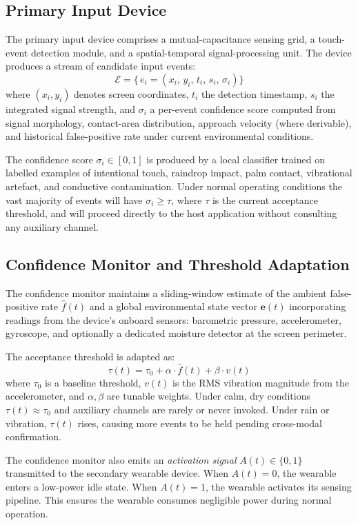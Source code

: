 \documentclass[11pt,letterpaper]{article}
\begin{document}
\subsection{Primary Input Device}

The primary input device comprises a mutual-capacitance sensing grid, a touch-event
detection module, and a spatial-temporal signal-processing unit. The device produces
a stream of candidate input events:
\[
  \mathcal{E} = \bigl\{\, e_i = (x_i,\, y_i,\, t_i,\, s_i,\, \sigma_i) \bigr\}
\]
where $(x_i, y_i)$ denotes screen coordinates, $t_i$ the detection timestamp, $s_i$
the integrated signal strength, and $\sigma_i$ a per-event confidence score computed
from signal morphology, contact-area distribution, approach velocity (where
derivable), and historical false-positive rate under current environmental conditions.

The confidence score $\sigma_i \in [0,1]$ is produced by a local classifier trained
on labelled examples of intentional touch, raindrop impact, palm contact, vibrational
artefact, and conductive contamination. Under normal operating conditions the vast
majority of events will have $\sigma_i \geq \tau$, where $\tau$ is the current
acceptance threshold, and will proceed directly to the host application without
consulting any auxiliary channel.

\subsection{Confidence Monitor and Threshold Adaptation}

The confidence monitor maintains a sliding-window estimate of the ambient
false-positive rate $\hat{f}(t)$ and a global environmental state vector
$\mathbf{e}(t)$ incorporating readings from the device's onboard sensors: barometric
pressure, accelerometer, gyroscope, and optionally a dedicated moisture detector at
the screen perimeter.

The acceptance threshold is adapted as:
\[
  \tau(t) = \tau_0 + \alpha \cdot \hat{f}(t) + \beta \cdot v(t)
\]
where $\tau_0$ is a baseline threshold, $v(t)$ is the RMS vibration magnitude from
the accelerometer, and $\alpha, \beta$ are tunable weights. Under calm, dry conditions
$\tau(t) \approx \tau_0$ and auxiliary channels are rarely or never invoked. Under
rain or vibration, $\tau(t)$ rises, causing more events to be held pending
cross-modal confirmation.

The confidence monitor also emits an \emph{activation signal} $A(t) \in \{0,1\}$
transmitted to the secondary wearable device. When $A(t) = 0$, the wearable enters
a low-power idle state. When $A(t) = 1$, the wearable activates its sensing pipeline.
This ensures the wearable consumes negligible power during normal operation.
\end{document}
